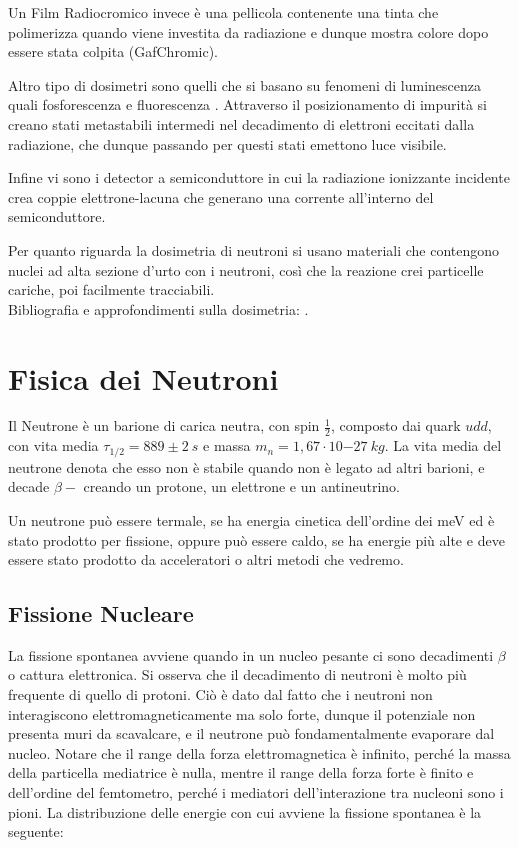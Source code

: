 \documentclass [a4paper, twoside] {book}
\begin{document}
Un Film Radiocromico invece è una pellicola contenente una tinta che polimerizza quando viene investita da radiazione e dunque mostra colore dopo essere stata colpita (GafChromic).

Altro tipo di dosimetri sono quelli che si basano su fenomeni di luminescenza quali fosforescenza e fluorescenza \cite{TLD}. Attraverso il posizionamento di impurità si creano stati metastabili intermedi nel decadimento di elettroni eccitati dalla radiazione, che dunque passando per questi stati emettono luce visibile.

Infine vi sono i detector a semiconduttore in cui la radiazione ionizzante incidente crea coppie elettrone-lacuna che generano una corrente all'interno del semiconduttore.

Per quanto riguarda la dosimetria di neutroni si usano materiali che contengono nuclei ad alta sezione d'urto con i neutroni, così che la reazione crei particelle cariche, poi facilmente tracciabili. \\

Bibliografia e approfondimenti sulla dosimetria: \cite{Corvisiero2} \cite{Beringer3} \cite{Laitano}.

\chapter{Fisica dei Neutroni}

Il Neutrone è un barione di carica neutra, con spin $\frac{1}{2}$, composto dai quark $udd$, con vita media $\tau_{1/2}=889\pm 2 \ s$ e massa $m_n=1,67\cdot 10{-27} \ kg$. 
La vita media del neutrone denota che esso non è stabile quando non è legato ad altri barioni, e decade $\beta - $ creando un protone, un elettrone e un antineutrino.

Un neutrone può essere termale, se ha energia cinetica dell'ordine dei meV ed è stato prodotto per fissione, oppure può essere caldo, se ha energie più alte e deve essere stato prodotto da acceleratori o altri metodi che vedremo.

\section{Fissione Nucleare}

La fissione spontanea avviene quando in un nucleo pesante ci sono decadimenti $\beta$ o cattura elettronica. Si osserva che il decadimento di neutroni è molto più frequente di quello di protoni. Ciò è dato dal fatto che i neutroni non interagiscono elettromagneticamente ma solo forte, dunque il potenziale non presenta muri da scavalcare, e il neutrone può fondamentalmente evaporare dal nucleo. 
Notare che  il range della forza elettromagnetica è infinito, perché la massa della particella mediatrice è nulla, mentre il range della forza forte è finito e dell'ordine del femtometro, perché i mediatori dell'interazione tra nucleoni sono i pioni. La distribuzione delle energie con cui avviene la fissione spontanea è la seguente:
\end{document}

